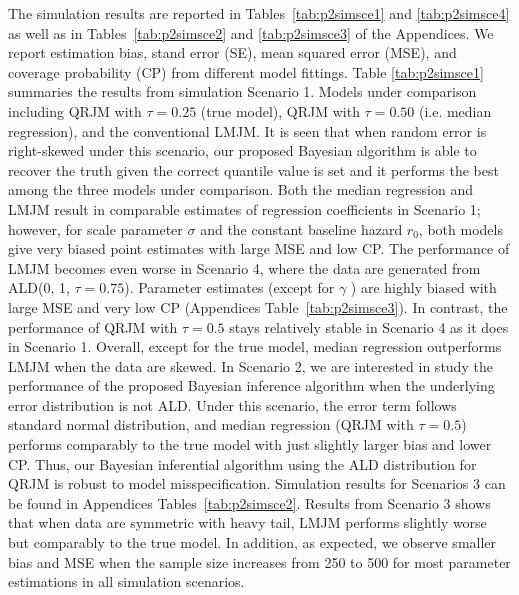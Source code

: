 The simulation results are reported in Tables~\ref{tab:p2simsce1} and \ref{tab:p2simsce4} as well as in Tables~\ref{tab:p2simsce2} and \ref{tab:p2simsce3} of the Appendices. We report estimation bias, stand error (SE), mean squared error (MSE), and coverage probability (CP) from different model fittings. Table \ref{tab:p2simsce1} summaries the results from simulation Scenario 1. Models under comparison including QRJM with $\tau=0.25$ (true model), QRJM with $\tau=0.50$ (i.e. median regression), and the conventional LMJM. It is seen that when random error is right-skewed under this scenario, our proposed Bayesian algorithm is able to recover the truth given the correct quantile value is set and it performs the best among the three models under comparison. Both the median regression and LMJM result in comparable estimates of regression coefficients in Scenario 1; however, for scale parameter $\sigma$ and the constant baseline hazard $r_0$, both models give very biased point estimates with large MSE and low CP. The performance of LMJM becomes even worse in Scenario 4, where the data are generated from ALD(0, 1, $\tau=0.75$). Parameter estimates (except for $\gamma$ ) are highly biased with large MSE and very low CP (Appendices Table~\ref{tab:p2simsce3}). In contrast, the performance of QRJM with $\tau=0.5$ stays relatively stable in Scenario 4 as it does in Scenario 1. Overall, except for the true model, median regression outperforms LMJM when the data are skewed. In Scenario 2, we are interested in study the performance of the proposed Bayesian inference algorithm when the underlying error distribution is not ALD. Under this scenario, the error term follows standard normal distribution, and median regression (QRJM with $\tau=0.5$) performs comparably to the true model with just slightly larger bias and lower CP. Thus, our Bayesian inferential algorithm using the ALD distribution for QRJM is robust to model misspecification. Simulation results for Scenarios 3 can be found in Appendices Tables~\ref{tab:p2simsce2}. Results from Scenario 3 shows that when data are symmetric with heavy tail, LMJM performs slightly worse but comparably to the true model. In addition, as expected, we observe smaller bias and MSE when the sample size increases from 250 to 500 for most parameter estimations in all simulation scenarios.

